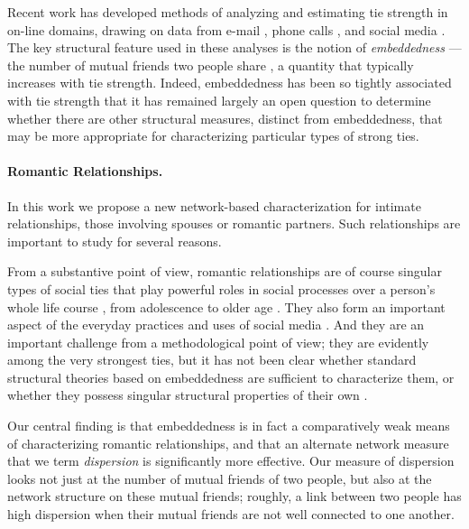 \documentclass{sigchi}
\newcommand{\xhdr}[1]{\paragraph*{\bf #1.}}
\begin{document}
Recent work has developed methods of analyzing and
estimating tie strength in on-line domains, drawing on data from
e-mail \cite{kossinets-email},
phone calls \cite{onnela-phone-data},
and social media \cite{gilbert-tie-strength}.
The key structural feature used in these analyses is the notion
of {\em embeddedness} --- the number of mutual friends two people share
\cite{marsden-tie-strength},
a quantity that typically increases with tie strength.
Indeed, embeddedness has been so tightly associated with tie strength that
it has remained largely an open question to determine whether there
are other structural measures, distinct from embeddedness,
that may be more appropriate for characterizing particular types of strong ties.

\xhdr{Romantic Relationships}
In this work we propose a new network-based characterization
for intimate relationships, those involving spouses or
romantic partners. 
Such relationships are important to study for several reasons.

From a substantive point of view, romantic relationships
are of course singular types of
social ties that play powerful roles in social processes 
over a person's whole life course
\cite{bott-family-soc-net},
from adolescence \cite{bearman-dating} to
older age \cite{cornwell-spousal-overlap}.
They also form an important aspect of the everyday practices and 
uses of social media
\cite{zhao-rel-partner-fb}.
And they are an important challenge from a methodological point of view;
they are evidently among the very strongest ties,
but it has not been clear whether standard structural theories
based on embeddedness are sufficient to characterize them, or
whether they possess singular structural properties of their own
\cite{felmlee-rel-partner,kalmijn-shared-networks}.

Our central finding is that embeddedness is in fact
a comparatively weak means of characterizing romantic relationships, 
and that an alternate network measure that we term 
{\em dispersion} is significantly more effective.
Our measure of dispersion looks not just at the number of
mutual friends of two people, but also at the network structure
on these mutual friends; roughly, a link between two people 
has high dispersion when their mutual friends are not well connected
to one another.
\end{document}
